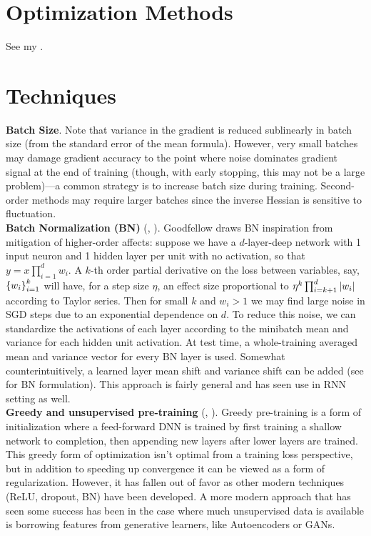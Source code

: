 \documentclass{article}
\begin{document}
\section{Optimization Methods}

See my .

\section{Techniques}\label{sec:techniques}

\noindent
\textbf{Batch Size}. Note that variance in the gradient is reduced sublinearly in batch size (from the standard error of the mean formula). However, very small batches may damage gradient accuracy to the point where noise dominates gradient signal at the end of training (though, with early stopping, this may not be a large problem)---a common strategy is to increase batch size during training. Second-order methods may require larger batches since the inverse Hessian is sensitive to fluctuation.
\\
\noindent
\textbf{Batch Normalization (BN)} (, ). Goodfellow draws BN inspiration from mitigation of higher-order affects: suppose we have a $d$-layer-deep network with 1 input neuron and 1 hidden layer per unit with no activation, so that $y=x\prod_{i=1}^dw_i$. A $k$-th order partial derivative on the loss between variables, say, $\left\{{w_i}\right\}_{i=1}^k$ will have, for a step size $\eta$, an effect size proportional to $\eta^k\prod_{i=k + 1}^{d}\left|{w_i}\right|$ according to Taylor series. Then for small $k$ and $w_i>1$ we may find large noise in SGD steps due to an exponential dependence on $d$. To reduce this noise, we can standardize the activations of each layer according to the minibatch mean and variance for each hidden unit activation. At test time, a whole-training averaged mean and variance vector for every BN layer is used. Somewhat counterintuitively, a learned layer mean shift and variance shift can be added (see  for BN formulation). This approach is fairly general and has seen use in RNN setting as well.
\\
\noindent
\textbf{Greedy and unsupervised pre-training} (, ). Greedy pre-training is a form of initialization where a feed-forward DNN is trained by first training a shallow network to completion, then appending new layers after lower layers are trained. This greedy form of optimization isn't optimal from a training loss perspective, but in addition to speeding up convergence it can be viewed as a form of regularization. However, it has fallen out of favor as other modern techniques (ReLU, dropout, BN) have been developed. A more modern approach that has seen some success has been in the case where much unsupervised data is available is borrowing features from generative learners, like Autoencoders or GANs.
\end{document}
